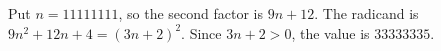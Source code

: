 Put $n=11111111$, so the second factor is $9n+12$. The radicand is $9n^2+12n+4=(3n+2)^2$. Since $3n+2>0$, the value is $\boxed{33333335}$.
